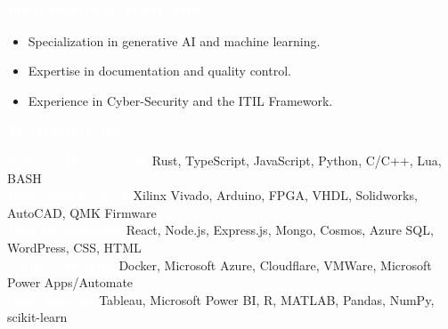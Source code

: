 \documentclass[9pt]{src/developercv} %
\begin{document}

	\vspace{-\baselineskip} %
	\colorbox{sky950}{\textcolor{white}{\LARGE\MakeUppercase{\textbf{Professional Summary}}}}\\%

	\begin{minipage}[t]{0.3\textwidth} 
			\begin{itemize}
					\item Specialization in generative AI and machine learning.
			\end{itemize}
	\end{minipage}
	\begin{minipage}[t]{0.3\textwidth} 
			\begin{itemize}
					\item Expertise in documentation and quality control.
			\end{itemize}
	\end{minipage}
	\begin{minipage}[t]{0.3\textwidth} 
			\begin{itemize}
					\item Experience in Cyber-Security and the ITIL Framework.
			\end{itemize}
	\end{minipage}

	\vspace{\baselineskip} %
	\colorbox{sky950}{\textcolor{white}{\LARGE\MakeUppercase{\textbf{Technologies}}}}\\%

	\begin{adjustwidth}{0.5cm}{0.5cm} 
    \setlength{\parskip}{0.5\baselineskip} %

    \colorbox{sky900}{\textcolor{white}{\textbf{Software Development:}}}\hfill Rust, TypeScript, JavaScript, Python, C/C++, Lua, BASH\\
    \colorbox{sky800}{\textcolor{white}{\textbf{Embedded Systems:}}}\hfill Xilinx Vivado, Arduino, FPGA, VHDL, Solidworks, AutoCAD, QMK Firmware\\
    \colorbox{sky700}{\textcolor{white}{\textbf{Web Development:}}}\hfill React, Node.js, Express.js, Mongo, Cosmos, Azure SQL, WordPress, CSS, HTML\\
    \colorbox{sky600}{\textcolor{white}{\textbf{Cloud \& DevOps:}}}\hfill Docker, Microsoft Azure, Cloudflare, VMWare, Microsoft Power Apps/Automate\\
    \colorbox{sky500}{\textcolor{white}{\textbf{Data Analysis:}}}\hfill Tableau, Microsoft Power BI, R, MATLAB, Pandas, NumPy, scikit-learn

	\end{adjustwidth} 
\end{document}
